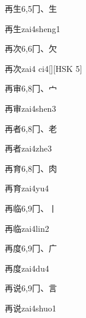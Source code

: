 \begin{entry}{再生}{6,5}{⼌、⽣}
  \begin{phonetics}{再生}{zai4sheng1}
  \end{phonetics}
\end{entry}

\begin{entry}{再次}{6,6}{⼌、⽋}
  \begin{phonetics}{再次}{zai4 ci4}[][HSK 5]
  \end{phonetics}
\end{entry}

\begin{entry}{再审}{6,8}{⼌、⼧}
  \begin{phonetics}{再审}{zai4shen3}
  \end{phonetics}
\end{entry}

\begin{entry}{再者}{6,8}{⼌、⽼}
  \begin{phonetics}{再者}{zai4zhe3}
  \end{phonetics}
\end{entry}

\begin{entry}{再育}{6,8}{⼌、⾁}
  \begin{phonetics}{再育}{zai4yu4}
  \end{phonetics}
\end{entry}

\begin{entry}{再临}{6,9}{⼌、⼁}
  \begin{phonetics}{再临}{zai4lin2}
  \end{phonetics}
\end{entry}

\begin{entry}{再度}{6,9}{⼌、⼴}
  \begin{phonetics}{再度}{zai4du4}
  \end{phonetics}
\end{entry}

\begin{entry}{再说}{6,9}{⼌、⾔}
  \begin{phonetics}{再说}{zai4shuo1}
  \end{phonetics}
\end{entry}

